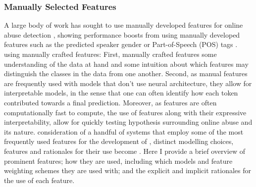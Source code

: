 \subsubsection{Manually Selected Features}
A large body of work has sought to use manually developed features for online abuse detection \citep[e.g.]{Davidson:2017,Waseem:2017,Wiegand:2019,Fortuna:2018}, showing performance boosts from using manually developed features such as the predicted speaker gender \citep{Waseem-Hovy:2016} or Part-of-Speech (POS) tags \citep{Davidson:2017}.
 using manually crafted features: First,  manually crafted features  some understanding of the data at hand and some intuition about which features may distinguish the classes in the data from one another.
Second, as manual features are frequently used with models that don't use neural architecture, they allow for interpretable models, in the sense that one can often identify how each token contributed towards a final prediction.
Moreover, as features are often computationally fast to compute, the use of features along with their expressive interpretability, allow for quickly testing hypothesis surrounding online abuse and its nature.
 consideration of a handful of systems that employ some of the most frequently used features for the development of , distinct modelling choices, features and rationales for their use become .
Here I provide a brief overview of prominent features; how they are used, including which models and feature weighting schemes they are used with; and the explicit and implicit rationales for the use of each feature.

